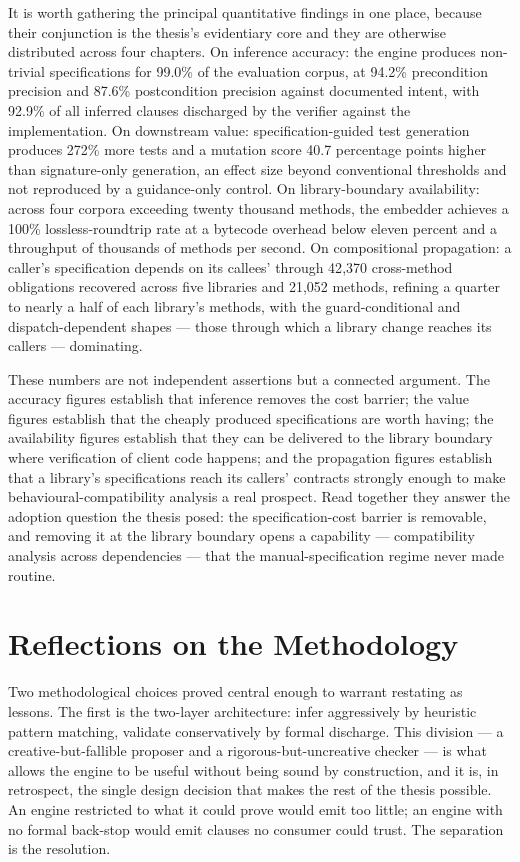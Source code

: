 It is worth gathering the principal quantitative findings in one place, because
their conjunction is the thesis's evidentiary core and they are otherwise
distributed across four chapters. On inference accuracy: the engine produces
non-trivial specifications for 99.0\% of the evaluation corpus, at 94.2\%
precondition precision and 87.6\% postcondition precision against documented intent,
with 92.9\% of all inferred clauses discharged by the verifier against the
implementation. On downstream value: specification-guided test generation produces
272\% more tests and a mutation score 40.7 percentage points higher than
signature-only generation, an effect size beyond conventional thresholds and not
reproduced by a guidance-only control. On library-boundary availability: across
four corpora exceeding twenty thousand methods, the embedder achieves a 100\%
lossless-roundtrip rate at a bytecode overhead below eleven percent and a
throughput of thousands of methods per second. On compositional propagation: a
caller's specification depends on its callees' through 42{,}370 cross-method
obligations recovered across five libraries and 21{,}052 methods, refining a
quarter to nearly a half of each library's methods, with the guard-conditional and
dispatch-dependent shapes --- those through which a library change reaches its
callers --- dominating.

These numbers are not independent assertions but a connected argument. The accuracy
figures establish that inference removes the cost barrier; the value figures
establish that the cheaply produced specifications are worth having; the
availability figures establish that they can be delivered to the library boundary
where verification of client code happens; and the propagation figures establish
that a library's specifications reach its callers' contracts strongly enough to
make behavioural-compatibility analysis a real prospect. Read together they answer
the adoption question the thesis posed: the specification-cost barrier is
removable, and removing it at the library boundary opens a capability ---
compatibility analysis across dependencies --- that the manual-specification regime
never made routine.

\section{Reflections on the Methodology}

Two methodological choices proved central enough to warrant restating as
lessons. The first is the two-layer architecture: infer aggressively by
heuristic pattern matching, validate conservatively by formal discharge. This
division --- a creative-but-fallible proposer and a rigorous-but-uncreative
checker --- is what allows the engine to be useful without being sound by
construction, and it is, in retrospect, the single design decision that makes
the rest of the thesis possible. An engine restricted to what it could prove
would emit too little; an engine with no formal back-stop would emit clauses no
consumer could trust. The separation is the resolution.

